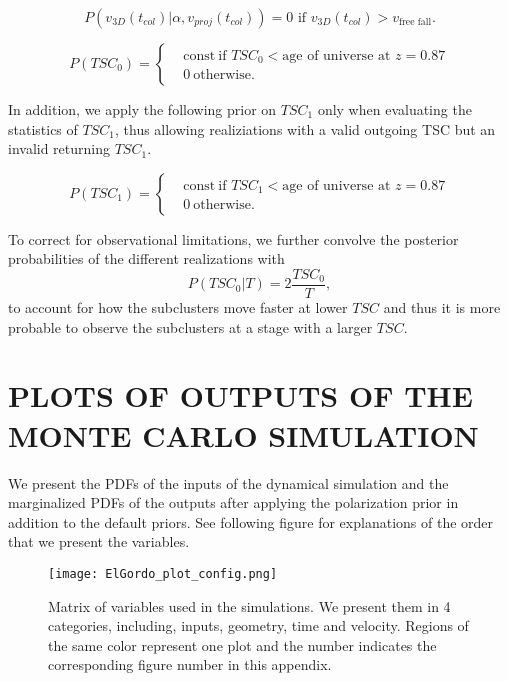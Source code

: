 \begin{equation}
	P(v_{3D}(t_{col}) | \alpha, v_{proj}(t_{col})) = 0\text{ if }v_{3D}(t_{col}) >
	v_{\text{free fall}}. 
\end{equation}


\begin{equation}
	P(TSC_0) = 
	\begin{cases}
		& \text{const}~\text{if }TSC_0 < \text{age of universe at } z=0.87	\\
		& 0~\text{otherwise}.
	\end{cases}
\end{equation}

In addition, we apply the following prior on $TSC_1$ only when evaluating the
statistics of $TSC_1$, thus allowing realiziations with a valid
outgoing TSC but an invalid returning $TSC_1$. 

\begin{equation}
	P(TSC_1) = 
	\begin{cases}
		& \text{const}~\text{if }TSC_1 < \text{age of universe at } z=0.87	\\
		& 0~\text{otherwise} \label{eqn:TSM_1}.
	\end{cases}
\end{equation}

To correct for observational limitations, we further convolve the
posterior probabilities of the different realizations with 
\begin{equation}
	P(TSC_0 | T) = 2 \frac{TSC_0}{T},
\end{equation}
to account for how the subclusters move faster at lower $TSC$ and thus it
is more probable to observe the subclusters at a stage with a larger $TSC$.

\par 

%

%

\section{PLOTS OF OUTPUTS OF THE MONTE CARLO SIMULATION}
We present the PDFs of the inputs of the dynamical simulation and the
marginalized PDFs of the outputs after applying the polarization prior in
addition to the default priors. See following figure for explanations of
the order that we present the variables. 
\begin{figure}
	\begin{center}
	\texttt{[image: ElGordo\_plot\_config.png]}
	\end{center}
	\caption{Matrix of variables used in the simulations. We present them in
	4 categories, including, inputs, geometry, time and velocity. Regions of
	the same color represent one plot and the number
indicates the corresponding figure number in this appendix.}
\end{figure}



